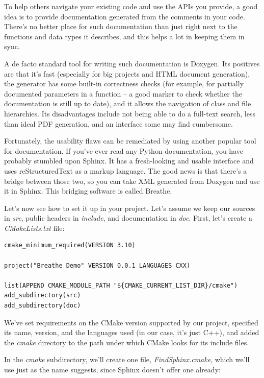 
To help others navigate your existing code and use the APIs you provide, a good idea is to provide documentation generated from the comments in your code. There's no better place for such documentation than just right next to the functions and data types it describes, and this helps a lot in keeping them in sync.

A de facto standard tool for writing such documentation is Doxygen. Its positives are that it's fast (especially for big projects and HTML document generation), the generator has some built-in correctness checks (for example, for partially documented parameters in a function – a good marker to check whether the documentation is still up to date), and it allows the navigation of class and file hierarchies. Its disadvantages include not being able to do a full-text search, less than ideal PDF generation, and an interface some may find cumbersome.

Fortunately, the usability flaws can be remediated by using another popular tool for documentation. If you've ever read any Python documentation, you have probably stumbled upon Sphinx. It has a fresh-looking and usable interface and uses reStructuredText as a markup language. The good news is that there's a bridge between those two, so you can take XML generated from Doxygen and use it in Sphinx. This bridging software is called Breathe.

Let's now see how to set it up in your project. Let's assume we keep our sources in \textit{src}, public headers in \textit{include}, and documentation in \textit{doc}. First, let's create a \textit{CMakeLists.txt} file:

\begin{lstlisting}[style=styleCMake]
cmake_minimum_required(VERSION 3.10)

project("Breathe Demo" VERSION 0.0.1 LANGUAGES CXX)

list(APPEND CMAKE_MODULE_PATH "${CMAKE_CURRENT_LIST_DIR}/cmake")
add_subdirectory(src)
add_subdirectory(doc)
\end{lstlisting}

We've set requirements on the CMake version supported by our project, specified its name, version, and the languages used (in our case, it's just C++), and added the \textit{cmake} directory to the path under which CMake looks for its include files.

In the \textit{cmake} subdirectory, we'll create one file, \textit{FindSphinx.cmake}, which we'll use just as the name suggests, since Sphinx doesn't offer one already:

